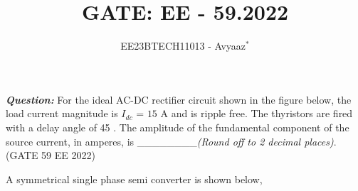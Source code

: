 \documentclass[journal,12pt,onecolumn]{IEEEtran}
\theoremstyle{remark}
\begin{document}

\vspace{3cm}

\title{GATE: EE - 59.2022}
\author{EE23BTECH11013 - Avyaaz$^{*}$%
}
\maketitle

\renewcommand{\thefigure}{\arabic{figure}}
\renewcommand{\thetable}{\arabic{table}}

\large\textbf{\textsl{Question:}}
For the ideal AC-DC rectifier circuit shown in the figure below, the load current
magnitude is $I_{dc}$ = $15$ A and is ripple free. The thyristors are fired with a delay angle
of 45\degree
. The amplitude of the fundamental component of the source current, in
amperes, is \_\_\_\_\_\_\_\_{\em (Round off to 2
decimal places)}. \hfill(GATE 59 EE 2022)
\begin{figure}[!h]
\centering

\end{figure}

\solution
\fi
\begin{table}[htbp]
\setlength{\extrarowheight}{4pt}
\setlength{\tabcolsep}{3pt}
\centering

\caption{}
\label{tab:inputs.EE.59.2022}
\end{table}
A symmetrical single phase semi converter is shown below,

\begin{figure}[!h]
\centering
 
\end{figure}
\end{document}
